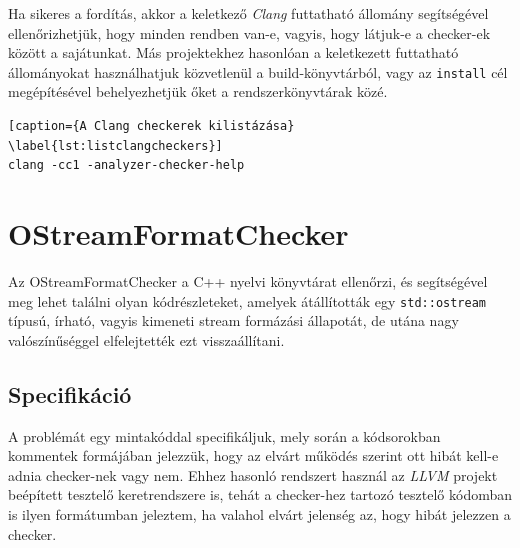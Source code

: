 \documentclass[a4paper,12pt]{report}
\begin{document}
Ha sikeres a fordítás, akkor a keletkező \emph{Clang} futtatható állomány segítségével ellenőrizhetjük, hogy minden rendben van-e, vagyis, hogy látjuk-e a checker-ek között a sajátunkat. Más projektekhez hasonlóan a keletkezett futtatható állományokat használhatjuk közvetlenül a build-könyvtárból, vagy az \texttt{install} cél megépítésével behelyezhetjük őket a rendszerkönyvtárak közé.

\begin{lstlisting}[caption={A Clang checkerek kilistázása}
\label{lst:listclangcheckers}]
clang -cc1 -analyzer-checker-help
\end{lstlisting}

\section{OStreamFormatChecker}
Az OStreamFormatChecker a C++ nyelvi könyvtárat ellenőrzi, és segítségével meg lehet találni olyan kódrészleteket, amelyek átállították egy \texttt{std::ostream} típusú, írható, vagyis kimeneti stream formázási állapotát, de utána nagy valószínűséggel elfelejtették ezt visszaállítani.

\subsection{Specifikáció}
A problémát egy mintakóddal specifikáljuk, mely során a kódsorokban kommentek formájában jelezzük, hogy az elvárt működés szerint ott hibát kell-e adnia checker-nek vagy nem. Ehhez hasonló rendszert használ az \emph{LLVM} projekt beépített tesztelő keretrendszere is, tehát a checker-hez tartozó tesztelő kódomban is ilyen formátumban jeleztem, ha valahol elvárt jelenség az, hogy hibát jelezzen a checker.
\end{document}
